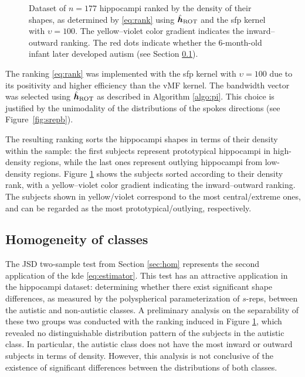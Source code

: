 \documentclass[oneside,11pt]{article}
\begin{document}
\begin{figure}[htpb!]
    \centering
    \caption{\small Dataset of $n=177$ hippocampi ranked by the density of their shapes, as determined by \eqref{eq:rank} using $\hat{{\boldsymbol{h}}}_{\mathrm{ROT}}$ and the sfp kernel with $\upsilon=100$. The yellow--violet color gradient indicates the inward--outward ranking. The red dots indicate whether the 6-month-old infant later developed autism (see Section \ref{sec:classes}).}
    \label{fig:subjects_sorted}
\end{figure}

The ranking \eqref{eq:rank} was implemented with the sfp kernel with $\upsilon=100$ due to its positivity and higher efficiency than the vMF kernel. The bandwidth vector was selected using $\hat{{\boldsymbol{h}}}_{\mathrm{ROT}}$ as described in Algorithm \ref{algo:pi}. This choice is justified by the unimodality of the distributions of the spokes directions (see Figure~\ref{fig:srepb}).

The resulting ranking sorts the hippocampi shapes in terms of their density within the sample: the first subjects represent prototypical hippocampi in high-density regions, while the last ones represent outlying hippocampi from low-density regions. Figure \ref{fig:subjects_sorted} shows the subjects sorted according to their density rank, with a yellow--violet color gradient indicating the inward--outward ranking. The subjects shown in yellow/violet correspond to the most central/extreme ones, and can be regarded as the most prototypical/outlying, respectively.

\subsection{Homogeneity of classes}
\label{sec:classes}

The JSD two-sample test from Section \ref{sec:hom} represents the second application of the kde \eqref{eq:estimator}. This test has an attractive application in the hippocampi dataset: determining whether there exist significant shape differences, as measured by the polyspherical parameterization of $s$-reps, between the autistic and non-autistic classes. A preliminary analysis on the separability of these two groups was conducted with the ranking induced in Figure \ref{fig:subjects_sorted}, which revealed no distinguishable distribution pattern of the subjects in the autistic class. In particular, the autistic class does not have the most inward or outward subjects in terms of density. However, this analysis is not conclusive of the existence of significant differences between the distributions of both classes.
\end{document}
